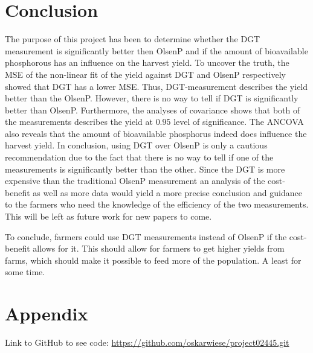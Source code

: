 \documentclass[11pt, fleqn, titlepage]{article}
\begin{document}
\section{Conclusion}

The purpose of this project has been to determine whether the DGT measurement is significantly better then OlsenP and if the amount of bioavailable phosphorous has an influence on the harvest yield. To uncover the truth, the MSE of the non-linear fit of the yield against DGT and OlsenP respectively showed that DGT has a lower MSE. Thus, DGT-measurement describes the yield better than the OlsenP. However, there is no way to tell if DGT is significantly better than OlsenP. Furthermore, the analyses of covariance shows that both of the measurements describes the yield at $ 0.95 $ level of significance. The ANCOVA also reveals that the amount of bioavailable phosphorus indeed does influence the harvest yield. In conclusion, using DGT over OlsenP is only a cautious recommendation due to the fact that there is no way to tell if one of the measurements is significantly better than the other. Since the DGT is more expensive than the traditional OlsenP measurement an analysis of the cost-benefit as well as more data would yield a more precise conclusion and guidance to the farmers who need the knowledge of the efficiency of the two measurements. This will be left as future work for new papers to come.

To conclude, farmers could use DGT measurements instead of OlsenP if the cost-benefit allows for it. This should allow for farmers to get higher yields from farms, which should make it possible to feed more of the population. A least for some time.
\newpage

\section{Appendix}

Link to GitHub to see code:
\url{https://github.com/oskarwiese/project02445.git}



\end{document}
